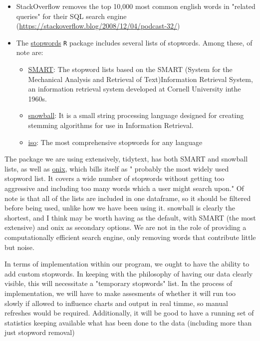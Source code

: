 \documentclass[11pt]{article}
\begin{document}
\begin{itemize}
\item StackOverflow removes the top 10,000 most common english words in
"related queries" for their SQL search engine
(\url{https://stackoverflow.blog/2008/12/04/podcast-32/})
\item The \href{https://github.com/quanteda/stopwords}{stopwords} \texttt{R} package includes several lists of stopwords. Among
these, of note are:
\begin{itemize}
\item \href{http://www.ai.mit.edu/projects/jmlr/papers/volume5/lewis04a/a11-smart-stop-list/english.stop}{SMART}: The stopword lists based on the SMART (System for the
Mechanical Analysis and Retrieval of Text)Information Retrieval
System, an information retrieval system developed at Cornell
University inthe 1960s.
\item \href{http://snowball.tartarus.org/algorithms/english/stop.txt}{snowball}: It is a small string processing language designed for
creating stemming algorithms for use in Information Retrieval.
\item \href{https://github.com/stopwords-iso/stopwords-iso/blob/master/stopwords-iso.json}{iso}: The most comprehensive stopwords for any language
\end{itemize}
\end{itemize}

The package we are using extensively, tidytext, has both SMART and
snowball lists, as well as \href{http://www.lextek.com/manuals/onix/stopwords1.html}{onix}, which bills itself as " probably the
most widely used stopword list. It covers a wide number of stopwords
without getting too aggressive and including too many words which a
user might search upon." Of note is that all of the lists are included
in one dataframe, so it should be filtered before being used, unlike
how we have been using it. snowball is clearly the shortest, and I
think may be worth having as the default, with SMART (the most
extensive) and onix as secondary options. We are not in the role of
providing a computationally efficient search engine, only removing
words that contribute little but noise.

In terms of implementation within our program, we ought to have the
ability to add custom stopwords. In keeping with the philosophy of
having our data clearly visible, this will necessitate a "temporary
stopwords" list. In the process of implementation, we will have to
make assesments of whether it will run too slowly if allowed to
influence charts and output in real timme, so manual refreshes would
be required. Additionally, it will be good to have a running set of
statistics keeping available what has been done to the data (including
more than just stopword removal)
\end{document}
